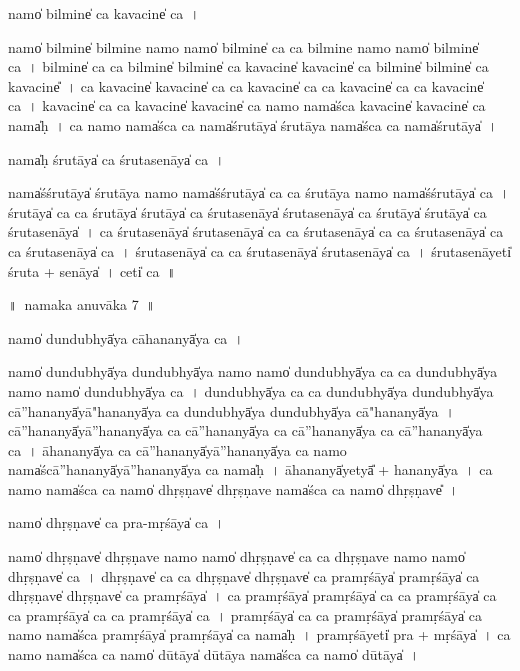 \documentclass[parskip, DIV=14]{scrartcl}
\begin{document}
{namo̍ bi॒lmine̍ ca kava॒cine̍ ca॒~।

namo̍ bi॒lmine̍ bi॒lmine॒ namo॒ namo̍ bi॒lmine̍ ca ca bi॒lmine॒ namo॒ namo̍ bi॒lmine̍ ca~।
bi॒lmine̍ ca ca bi॒lmine̍ bi॒lmine̍ ca kava॒cine̍ kava॒cine̍ ca bi॒lmine̍ bi॒lmine̍ ca kava॒cine̎~।
ca॒ ka॒va॒cine̍ kava॒cine̍ ca ca kava॒cine̍ ca ca kava॒cine̍ ca ca kava॒cine̍ ca~।
ka॒va॒cine̍ ca ca kava॒cine̍ kava॒cine̍ ca॒ namo॒ nama̍śca kava॒cine̍ kava॒cine̍ ca॒ nama̍ḥ~।
ca॒ namo॒ nama̍śca ca॒ nama̍śru॒tāya̍ śru॒tāya॒ nama̍śca ca॒ nama̍śru॒tāya̍~।

nama̍ḥ śru॒tāya̍ ca śrutase॒nāya̍ ca~।

nama̍śśru॒tāya̍ śru॒tāya॒ namo॒ nama̍śśru॒tāya̍ ca ca śru॒tāya॒ namo॒ nama̍śśru॒tāya̍ ca~।
śru॒tāya̍ ca ca śru॒tāya̍ śru॒tāya̍ ca śrutase॒nāya̍  śrutase॒nāya̍ ca śru॒tāya̍ śru॒tāya̍ ca śrutase॒nāya̍~।
ca॒ śru॒ta॒se॒nāya̍  śrutase॒nāya̍ ca ca śrutase॒nāya̍ ca ca śrutase॒nāya̍ ca ca śrutase॒nāya̍ ca~।
śru॒ta॒se॒nāya̍ ca ca śrutase॒nāya̍ śrutase॒nāya̍ ca~।
śru॒ta॒se॒nāyeti̍ śruta + se॒nāya̍~।
ceti̍ ca~॥

\newpage
\LARGE
॥~namaka anuvāka 7~॥ 
\Large

namo̍ dundu॒bhyā̍ya cāhana॒nyā̍ya ca॒~।

namo̍ dundu॒bhyā̍ya dundu॒bhyā̍ya॒ namo॒ namo̍ dundu॒bhyā̍ya ca ca dundu॒bhyā̍ya॒ namo॒ namo̍ dundu॒bhyā̍ya ca~।
du॒ndu॒bhyā̍ya ca ca dundu॒bhyā̍ya dundu॒bhyā̍ya cā''hana॒nyā̍yā"hana॒nyā̍ya ca dundu॒bhyā̍ya dundu॒bhyā̍ya cā"hana॒nyā̍ya~।
cā॒''ha॒na॒nyā̍yā''hana॒nyā̍ya ca cā''hana॒nyā̍ya ca cā''hana॒nyā̍ya ca cā''hana॒nyā̍ya ca~।
ā॒ha॒na॒nyā̍ya ca cā''hana॒nyā̍yā''hana॒nyā̍ya ca॒ namo॒ nama̍ścā''hana॒nyā̍yā''hana॒nyā̍ya ca॒ nama̍ḥ~।
ā॒ha॒na॒nyā̍yetyā̎ + ha॒na॒nyā̍ya~।
ca॒ namo॒ nama̍śca ca॒ namo̍ dhṛ॒ṣṇave̍ dhṛ॒ṣṇave॒ nama̍śca ca॒ namo̍ dhṛ॒ṣṇave̎~।

namo̍ dhṛ॒ṣṇave̍ ca pra-mṛ॒śāya̍ ca॒~।

namo̍ dhṛ॒ṣṇave̍ dhṛ॒ṣṇave॒ namo॒ namo̍ dhṛ॒ṣṇave̍ ca ca dhṛ॒ṣṇave॒ namo॒ namo̍ dhṛ॒ṣṇave̍ ca~।
dhṛ॒ṣṇave̍ ca ca dhṛ॒ṣṇave̍ dhṛ॒ṣṇave̍ ca pramṛ॒śāya̍ pramṛ॒śāya̍ ca dhṛ॒ṣṇave̍ dhṛ॒ṣṇave̍ ca pramṛ॒śāya̍~।
ca॒ pra॒mṛ॒śāya̍ pramṛ॒śāya̍ ca ca pramṛ॒śāya̍ ca ca pramṛ॒śāya̍ ca ca pramṛ॒śāya̍ ca~।
pra॒mṛ॒śāya̍ ca ca pramṛ॒śāya̍ pramṛ॒śāya̍ ca॒ namo॒ nama̍śca pramṛ॒śāya̍ pramṛ॒śāya̍ ca॒ nama̍ḥ~।
pra॒mṛ॒śāyeti̍ pra + mṛ॒śāya̍~।
ca॒ namo॒ nama̍śca ca॒ namo̍ dū॒tāya̍ dū॒tāya॒ nama̍śca ca॒ namo̍ dū॒tāya̍~।

}
\end{document}
